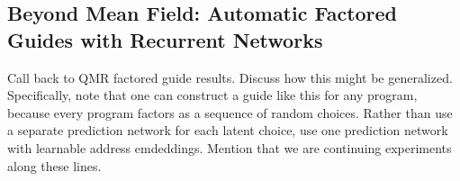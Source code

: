 \subsection{Beyond Mean Field: Automatic Factored Guides with Recurrent Networks}

Call back to QMR factored guide results. Discuss how this might be generalized. Specifically, note that one can construct a guide like this for any program, because every program factors as a sequence of random choices. Rather than use a separate prediction network for each latent choice, use one prediction network with learnable address emdeddings. Mention that we are continuing experiments along these lines.







